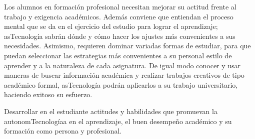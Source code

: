 \begin{syllabus}


\begin{justification}
Los alumnos en formación profesional necesitan mejorar su actitud frente al trabajo y exigencia académicos. Además conviene que entiendan el proceso mental que se da en el ejercicio del estudio para lograr el aprendizaje; asTecnología  sabrán dónde y cómo hacer los ajustes más convenientes a sus necesidades. Asimismo, requieren dominar variadas formas de estudiar, para que puedan seleccionar las estrategias  más convenientes a su personal estilo de aprender y a la naturaleza de cada asignatura. De igual modo conocer y usar  maneras de buscar información académica y realizar trabajos creativos de tipo académico formal, asTecnología podrán  aplicarlos a su trabajo universitario, haciendo exitoso su esfuerzo.
\end{justification}

\begin{goals}
\item Desarrollar en el estudiante actitudes y habilidades que promuevan la autonomTecnologíaa en el aprendizaje, el buen desempeño académico y su formación como persona y profesional.
\end{goals}

\begin{outcomes}
    \item {}
    \item {}
    \item {}
\end{outcomes}

\begin{competences}
    \item {}
    \item {}
\end{competences}


\end{syllabus}
